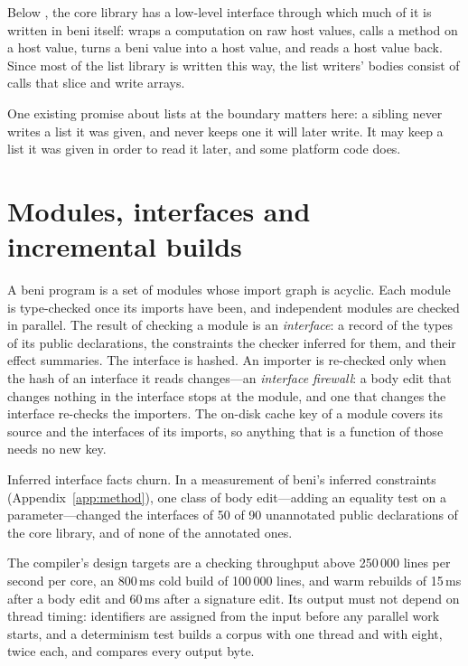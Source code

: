 Below , the core library has a low-level  interface through which much of it
is written in beni itself:  wraps a computation on raw host values, 
calls a method on a host value,  turns a beni value into a host value, and 
reads a host value back. Since most of the list library is written this way, the list writers'
bodies consist of  calls that slice and write arrays.

One existing promise about lists at the boundary matters here: a sibling never writes a list it was
given, and never keeps one it will later write. It may keep a list it was given in order to read it
later, and some platform code does.

\section{Modules, interfaces and incremental builds}
\label{sec:bg-modules}

A beni program is a set of modules whose import graph is acyclic. Each module is type-checked once
its imports have been, and independent modules are checked in parallel. The result of checking a
module is an \emph{interface}: a record of the types of its public declarations, the constraints the
checker inferred for them, and their effect summaries. The interface is hashed. An importer is
re-checked only when the hash of an interface it reads changes---an \emph{interface firewall}: a
body edit that changes nothing in the interface stops at the module, and one that changes the
interface re-checks the importers. The on-disk cache key of a module covers its source and the
interfaces of its imports, so anything that is a function of those needs no new key.

Inferred interface facts churn. In a measurement of beni's inferred  constraints
(Appendix~\ref{app:method}), one class of body edit---adding an equality test on a parameter---changed
the interfaces of 50 of 90 unannotated public declarations of the core library, and of none of the
annotated ones.

The compiler's design targets are a checking throughput above 250\,000 lines per second per core,
an 800\,ms cold build of 100\,000 lines, and warm rebuilds of 15\,ms after a body edit and 60\,ms after
a signature edit. Its output must not depend on thread timing: identifiers are assigned from the
input before any parallel work starts, and a determinism test builds a corpus with one thread and
with eight, twice each, and compares every output byte.

